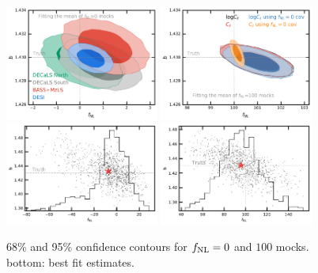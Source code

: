 \begin{figure}
    \centering
    \includegraphics[width=0.45\textwidth]{figures/mcmc_zero.pdf} 
    \includegraphics[width=0.45\textwidth]{figures/mcmc_po100.pdf} 
    \includegraphics[width=0.45\textwidth]{figures/bestfit_zero.pdf} 
    \includegraphics[width=0.45\textwidth]{figures/bestfit_po100.pdf}         
    \caption{68\% and 95\% confidence contours for $f_{\rm NL}=0$ and $100$ mocks. bottom: best fit estimates.}\label{fig:mcmc_mocks}
\end{figure}



